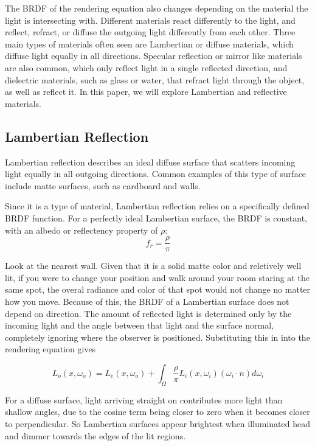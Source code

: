 \documentclass[12pt]{article}
\begin{document}
The BRDF of the rendering equation also changes depending on the material the light is intersecting with. Different materials react differently to the light, and reflect, refract, or diffuse the outgoing light differently from each other. Three main types of materials often seen are Lambertian or diffuse materials, which diffuse light equally in all directions. Specular reflection or mirror like materials are also common, which only reflect light in a single reflected direction, and dielectric materials, such as glass or water, that refract light through the object, as well as reflect it. In this paper, we will explore Lambertian and reflective materials.


\subsection{Lambertian Reflection}
Lambertian reflection describes an ideal diffuse surface that scatters incoming light equally in all outgoing directions. Common examples of this type of surface include matte surfaces, such as cardboard and walls.

Since it is a type of material, Lambertian reflection relies on a specifically defined BRDF function. For a perfectly ideal Lambertian surface, the BRDF is constant, with an albedo or reflectency property of $\rho$:
\[f_r = \frac{\rho}{\pi}\]




Look at the nearest wall. Given that it is a solid matte color and reletively well lit, if you were to change your position and walk around your room staring at the same spot, the overal radiance and color of that spot would not change no matter how you move. Because of this, the BRDF of a Lambertian surface does not depend on direction. The amount of reflected light is determined only by the incoming light and the angle between that light and the surface normal, completely ignoring where the observer is positioned. \newline
\newpage
Substituting this in into the rendering equation gives

\[
L_o(x, \omega_o) = L_e(x, \omega_o) + \int_{\Omega}\frac{\rho}{\pi}L_i(x, \omega_i)(\omega_i\cdot n) d\omega_i
\]

For a diffuse surface, light arriving straight on contributes more light than shallow angles, due to the cosine term being closer to zero when it becomes closer to perpendicular. So Lambertian surfaces appear brightest when illuminated head and dimmer towards the edges of the lit regions. 
\newline
\end{document}
